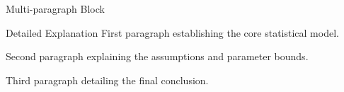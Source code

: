 \documentclass[14pt,t]{beamer}
\begin{document}
\begin{frame}{Multi-paragraph Block}
\begin{block}{Detailed Explanation}
First paragraph establishing the core statistical model.

Second paragraph explaining the assumptions and parameter bounds.

Third paragraph detailing the final conclusion.
\end{block}
\end{frame}
\end{document}
